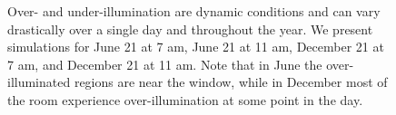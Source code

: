 \documentclass[10pt,twocolumn,letterpaper]{article}
\begin{document}
\begin{figure}[t]
%
\caption{Over- and under-illumination are dynamic conditions and can vary drastically
  over a single day and throughout the year.  We present simulations for  June 21
  at 7 am, June 21 at 11 am, December 21 at 7 am, and December 21 at 11
  am.  Note that in June the over-illuminated regions are
  near the window, while in December most of the room
  experience over-illumination at some point in the day.  } 
\vspace{-0.05in}
\label{FIGURE:mrc331}
\end{figure}

\end{document}
